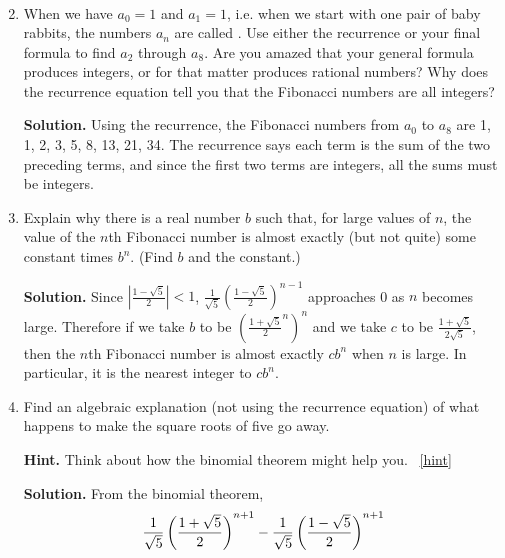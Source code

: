 \documentclass{book}
\begin{document}
\begin{activity}[]
\begin{enumerate}[font=\bfseries,label=(\alph*),ref=\alph*]
\begin{align*}
\end{align*}
%
\item\label{task-251} \hypertarget{p-1401}{}%
When we have \(a_0=1\) and \(a_1=1\), i.e. when we start with one pair of baby rabbits, the numbers \(a_n\) are called .  Use either the recurrence or your final formula to find \(a_2\) through \(a_8\).  Are you amazed that your general formula produces integers, or for that matter produces rational numbers?  Why does the recurrence equation tell you that the Fibonacci numbers are all integers?%
\par\smallskip%
\noindent\textbf{Solution.}\hypertarget{solution-182}{}\quad%
\hypertarget{p-1402}{}%
Using the recurrence, the Fibonacci numbers from \(a_0\) to \(a_8\) are 1, 1, 2, 3, 5, 8, 13, 21, 34. The recurrence says each term is the sum of the two preceding terms, and since the first two terms are integers, all the sums must be integers.%
\item\label{task-252} \hypertarget{p-1403}{}%
Explain why there is a real number \(b\) such that, for large values of \(n\), the value of the \(n\)th Fibonacci number is almost exactly (but not quite) some constant times \(b^n\). (Find \(b\) and the constant.)%
\par\smallskip%
\noindent\textbf{Solution.}\hypertarget{solution-183}{}\quad%
\hypertarget{p-1404}{}%
Since \(\displaystyle \left|\frac{1-\sqrt{5}}{2}\right| \lt 1\), \(\displaystyle\frac{1}{\sqrt{5}}\left(\frac{1-\sqrt{5}}{2}\right)^{n-1}\) approaches 0 as \(n\) becomes large. Therefore if we take \(b\) to be \(\displaystyle \left(\frac{1+\sqrt{5}}{2}^n\right)^n\) and we take \(c\) to be \(\frac{1+\sqrt{5}}{2\sqrt{5}}\), then the \(n\)th Fibonacci number is almost exactly \(cb^n\) when \(n\) is large. In particular, it is the nearest integer to \(cb^n\).%
\item\label{task-253} \hypertarget{p-1405}{}%
Find an algebraic explanation (not using the recurrence equation) of what happens to make the square roots of five go away.%
\par\smallskip%
\noindent\textbf{Hint.}\hypertarget{hint-173}{}\quad%
\hypertarget{p-1406}{}%
Think about how the binomial theorem might help you.%
~\hfill{\tiny\hyperlink{a-269.d}{[hint]}\hypertarget{q-269.d}{}}\par\smallskip%
\noindent\textbf{Solution.}\hypertarget{solution-184}{}\quad%
\hypertarget{p-1407}{}%
From the binomial theorem,%
\begin{align*}
\amp \frac{1}{\sqrt{5}}\left(\frac{1+\sqrt{5}}{   2}\right)^{n+1}- \frac{1}{\sqrt{5}}\left(\frac{1-\sqrt{5}}{2}\right)^{n+1}\\

\end{align*}
\end{enumerate}
\end{activity}
\end{document}

